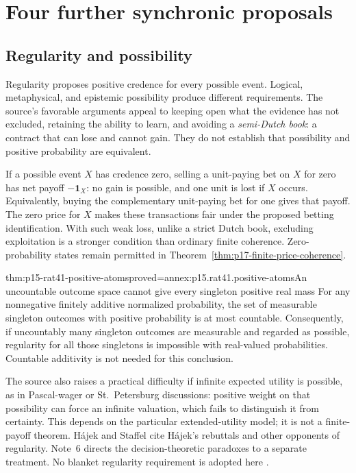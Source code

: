 \section{Four further synchronic proposals}
\label{sec:p15-rat41-synchronic}

\subsection{Regularity and possibility}

Regularity proposes positive credence for every possible event. Logical,
metaphysical, and epistemic possibility produce different requirements.
The source's favorable arguments appeal to keeping open what the evidence
has not excluded, retaining the ability to learn, and avoiding a
\emph{semi-Dutch book}: a contract that can lose and cannot gain.
They do not establish that possibility and positive probability are
equivalent.

If a possible event \(X\) has credence zero, selling a unit-paying bet
on \(X\) for zero has net payoff \(-\mathbf1_X\): no gain is possible,
and one unit is lost if \(X\) occurs. Equivalently, buying the
complementary unit-paying bet for one gives that payoff. The zero price
for \(X\) makes these transactions fair under the proposed betting
identification. With such weak loss,
unlike a strict Dutch book, excluding exploitation is a stronger condition
than ordinary finite coherence. Zero-probability states remain permitted
in Theorem~\ref{thm:p17-finite-price-coherence}.

\begin{hbtheorem}{thm:p15-rat41-positive-atoms}{proved=annex:p15.rat41.positive-atoms}{An uncountable outcome space cannot give every singleton positive real mass}
For any nonnegative finitely additive normalized probability, the set
of measurable singleton outcomes with positive probability is at most
countable. Consequently, if uncountably many singleton outcomes are
measurable and regarded as possible, regularity for all those singletons
is impossible with real-valued probabilities. Countable additivity is
not needed for this conclusion.
\end{hbtheorem}

The source also raises a practical difficulty if infinite expected
utility is possible, as in Pascal-wager or St.~Petersburg discussions:
positive weight on that possibility can force an infinite valuation,
which fails to distinguish it from certainty. This depends on the
particular extended-utility model; it is not a finite-payoff theorem.
H\'ajek and Staffel cite H\'ajek's rebuttals and other opponents of
regularity. Note~6 directs the decision-theoretic paradoxes to a separate
treatment. No blanket regularity requirement is adopted here
\parencite[pp.~242--243 and p.~248, n.~6]{HajekStaffel2021Dynamics}.

